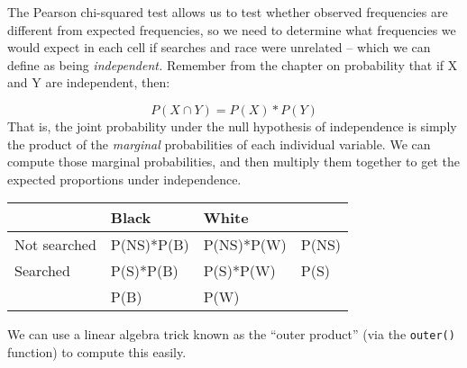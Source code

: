 \documentclass[]{book}
\theoremstyle{definition}
\theoremstyle{definition}
\theoremstyle{definition}
\theoremstyle{remark}
\begin{document}
The Pearson chi-squared test allows us to test whether observed
frequencies are different from expected frequencies, so we need to
determine what frequencies we would expect in each cell if searches and
race were unrelated -- which we can define as being \emph{independent.}
Remember from the chapter on probability that if X and Y are
independent, then:

\[
P(X \cap Y) = P(X) * P(Y)
\] That is, the joint probability under the null hypothesis of
independence is simply the product of the \emph{marginal} probabilities
of each individual variable. We can compute those marginal
probabilities, and then multiply them together to get the expected
proportions under independence.

\begin{longtable}[]{@{}llll@{}}
\toprule
& Black & White &\tabularnewline
\midrule
\endhead
Not searched & P(NS)*P(B) & P(NS)*P(W) & P(NS)\tabularnewline
Searched & P(S)*P(B) & P(S)*P(W) & P(S)\tabularnewline
& P(B) & P(W) &\tabularnewline
\bottomrule
\end{longtable}

We can use a linear algebra trick known as the ``outer product'' (via
the \texttt{outer()} function) to compute this easily.
\end{document}
